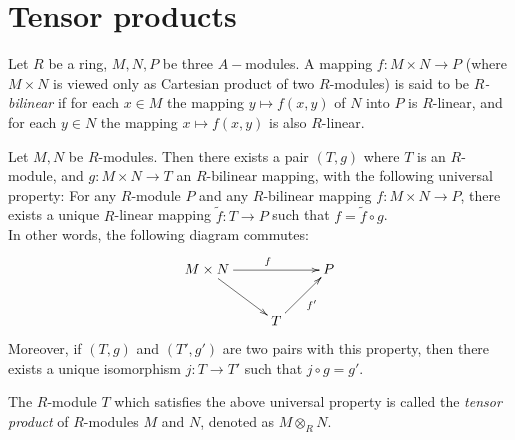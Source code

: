 \section{Tensor products}
\label{section-tensor-product}

\begin{definition}
\label{definition-bilinear}
Let $R$ be a ring, $M,N,P$ be three $A-$modules.
A mapping $f:M \times N\rightarrow P$ (where $M\times N$
is viewed only as Cartesian product of two $R$-modules) is said to be 
{\it $R$-bilinear} if for each $x \in M$
the mapping $y\mapsto f(x,y)$ of $N$ into $P$ is $R$-linear, and for each 
$y\in N$ the mapping $x\mapsto f(x,y)$ is also $R$-linear.
\end{definition}

\begin{lemma}
\label{lemma-tensor-product}
Let $M,N$ be $R$-modules. Then there exists a pair $(T,g)$ 
where $T$ is an $R$-module, and
$g:M\times N \rightarrow T$ an $R$-bilinear
mapping, with the following universal property:
For any $R$-module $P$ and any $R$-bilinear mapping
$f:M\times N \rightarrow P$, there 
exists a unique $R$-linear
mapping $\tilde{f}:T\rightarrow
P$ such that $f=\tilde{f} \circ g$. \\
In other words, the following diagram commutes:
\[ \xymatrix{
    M\times N \ar[rr]^{f} \ar[dr] & &P\\
    &T \ar[ur]_{f'}
    }
\]
Moreover, if $(T,g)$ and $(T',g')$
are two pairs with this property, then there 
exists a unique isomorphism
$j:T\rightarrow T'$ such that $j\circ g=g'$.
\end{lemma}

\noindent
The $R$-module $T$ which satisfies the above universal property is called
the  \textit{tensor product} of $R$-modules $M$ and $N$, denoted as
$M\otimes_{R} N$.

